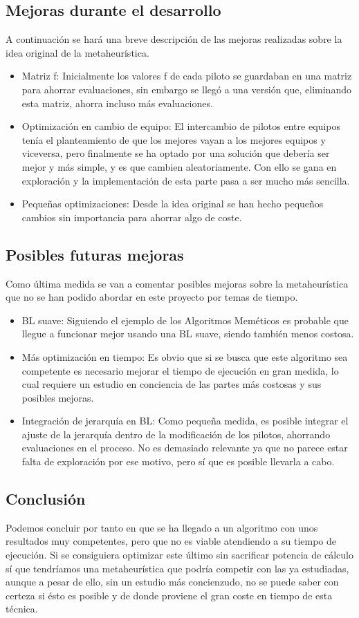 \documentclass{article}
\begin{document}
	\subsection{Mejoras durante el desarrollo}
	A continuación se hará una breve descripción de las mejoras realizadas sobre la idea original de la metaheurística.
	\begin{itemize}
		\item Matriz f: Inicialmente los valores f de cada piloto se guardaban en una matriz para ahorrar evaluaciones, sin embargo se llegó a una versión que, eliminando esta matriz, ahorra incluso más evaluaciones.
		\item Optimización en cambio de equipo: El intercambio de pilotos entre equipos tenía el planteamiento de que los mejores vayan a los mejores equipos y viceversa, pero finalmente se ha optado por una solución que debería ser mejor y más simple, y es que cambien aleatoriamente. Con ello se gana en exploración y la implementación de esta parte pasa a ser mucho más sencilla.
		\item Pequeñas optimizaciones: Desde la idea original se han hecho pequeños cambios sin importancia para ahorrar algo de coste.
	\end{itemize}
	\newpage
	\subsection{Posibles futuras mejoras}
	Como última medida se van a comentar posibles mejoras sobre la metaheurística que no se han podido abordar en este proyecto por temas de tiempo.
	\begin{itemize}
		\item BL suave: Siguiendo el ejemplo de los Algoritmos Meméticos es probable que llegue a funcionar mejor usando una BL suave, siendo también menos costosa.
		\item Más optimización en tiempo: Es obvio que si se busca que este algoritmo sea competente es necesario mejorar el tiempo de ejecución en gran medida, lo cual requiere un estudio en conciencia de las partes más costosas y sus posibles mejoras.
		\item Integración de jerarquía en BL: Como pequeña medida, es posible integrar el ajuste de la jerarquía dentro de la modificación de los pilotos, ahorrando evaluaciones en el proceso. No es demasiado relevante ya que no parece estar falta de exploración por ese motivo, pero sí que es posible llevarla a cabo.
	\end{itemize}

	\subsection{Conclusión}
	Podemos concluir por tanto en que se ha llegado a un algoritmo con unos resultados muy competentes, pero que no es viable atendiendo a su tiempo de ejecución. Si se consiguiera optimizar este último sin sacrificar potencia de cálculo sí que tendríamos una metaheurística que podría competir con las ya estudiadas, aunque a pesar de ello, sin un estudio más concienzudo, no se puede saber con certeza si ésto es posible y de donde proviene el gran coste en tiempo de esta técnica.
	
\end{document}
